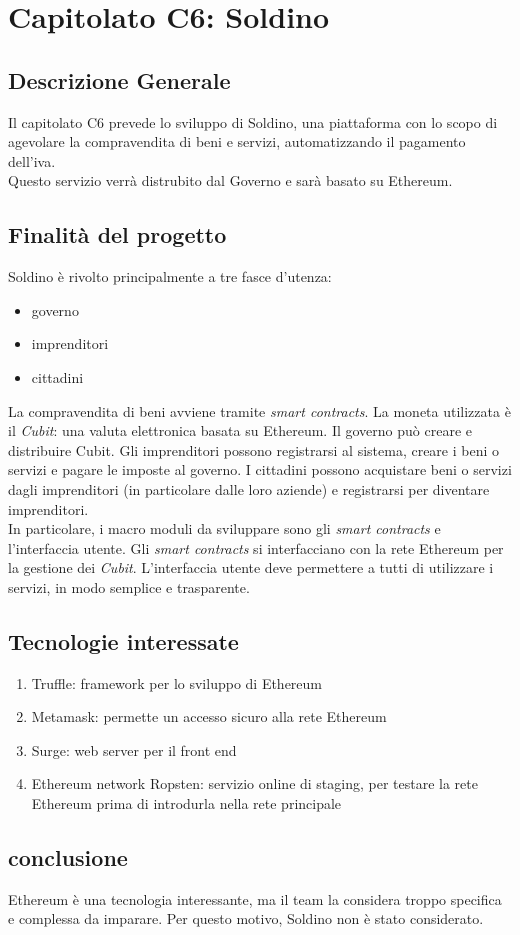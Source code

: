 \chapter{Capitolato C6: Soldino}
\section{Descrizione Generale}

Il capitolato C6 prevede lo sviluppo di Soldino, una piattaforma con lo scopo di agevolare la compravendita di beni e servizi, automatizzando il pagamento dell'iva.\\
Questo servizio verrà distrubito dal Governo e sarà basato su Ethereum. 


\section{Finalit\`a del progetto}
Soldino è rivolto principalmente a tre fasce d'utenza:
\begin{itemize}
	\item governo
	\item imprenditori
	\item cittadini
\end{itemize}
La compravendita di beni avviene tramite \textit{smart contracts}. La moneta utilizzata è il \textit{Cubit}: una valuta elettronica basata su Ethereum.
Il governo può creare e distribuire Cubit. Gli imprenditori possono registrarsi al sistema, creare i beni o servizi e pagare le imposte al governo. I cittadini possono acquistare beni o servizi dagli imprenditori (in particolare dalle loro aziende) e registrarsi per diventare imprenditori.\\
In particolare, i macro moduli da sviluppare sono gli \textit{smart contracts} e l'interfaccia utente. Gli \textit{smart contracts} si interfacciano con la rete Ethereum per la gestione dei \textit{Cubit}. L'interfaccia utente deve permettere a tutti di utilizzare i servizi, in modo semplice e trasparente.


\section{Tecnologie interessate}
\begin{enumerate}
	\item Truffle: framework per lo sviluppo di Ethereum
	\item Metamask: permette un accesso sicuro alla rete Ethereum
	\item Surge: web server per il front end
	\item Ethereum network Ropsten: servizio online di staging, per testare la rete Ethereum prima di introdurla nella rete principale
	
\end{enumerate}
\section{conclusione}
Ethereum è una tecnologia interessante, ma il team la considera troppo specifica e complessa da imparare. Per questo motivo, Soldino non è stato considerato. 